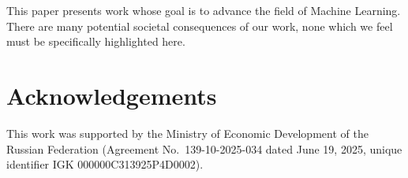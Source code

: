 \documentclass{article}
\theoremstyle{plain}
\theoremstyle{definition}
\theoremstyle{remark}
\begin{document}
This paper presents work whose goal is to advance the field of Machine
Learning. There are many potential societal consequences of our work, none
which we feel must be specifically highlighted here.

\section*{Acknowledgements}

This work was supported by the Ministry of Economic Development of the Russian
Federation (Agreement No.\ 139-10-2025-034 dated June 19, 2025, unique
identifier IGK 000000C313925P4D0002).

\newpage

% 







\end{document}
